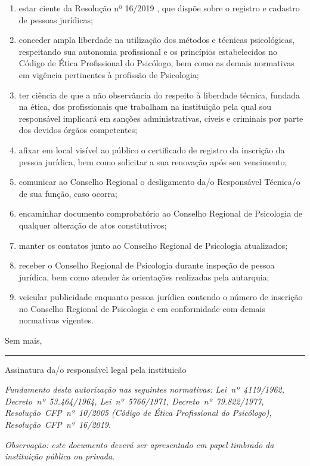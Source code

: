 \documentclass[openright, oneside, a4paper, article, 10pt, brazil]{abntex2}
\begin{document}
\begin{enumerate}
\item estar ciente da Resolução nº 16/2019 , que dispõe sobre o registro e cadastro de pessoas jurídicas;
\item conceder ampla liberdade na utilização dos métodos e técnicas psicológicas, respeitando sua autonomia profissional e os princípios estabelecidos no Código de Ética Profissional do Psicólogo, bem como as demais normativas em vigência pertinentes à profissão de Psicologia;
\item ter ciência de que a não observância do respeito à liberdade técnica, fundada na ética, dos profissionais que trabalham na instituição pela qual sou responsável implicará em sanções administrativas, cíveis e criminais por parte dos devidos órgãos competentes;
\item afixar em local visível ao público o certificado de registro da inscrição da pessoa jurídica, bem como solicitar a sua renovação após seu vencimento;
\item comunicar ao Conselho Regional o desligamento da/o Responsável Técnica/o de sua função, caso ocorra;
\item encaminhar documento comprobatório ao Conselho Regional de Psicologia de qualquer alteração de
atos constitutivos;
\item manter os contatos junto ao Conselho Regional de Psicologia atualizados;
\item receber o Conselho Regional de Psicologia durante inspeção de pessoa jurídica, bem como atender às orientações
realizadas pela autarquia;
\item veicular publicidade enquanto pessoa jurídica contendo o número de inscrição no Conselho Regional de Psicologia
e em conformidade com demais normativas vigentes.
\end{enumerate}
\vspace{\baselineskip}

\noindent Sem mais,
\vspace{1.5\baselineskip}

\vspace{5\baselineskip}

\rule{24em}{0.4pt}

\small Assinatura da/o responsável legal pela instituicão
\vfill

\raggedleft\scriptsize
\textit{Fundamento desta autorização nas seguintes normativas: Lei~nº~4119/1962, Decreto~nº~53.464/1964, Lei~nº~5766/1971,
Decreto~nº~79.822/1977, Resolução~CFP~nº~10/2005 (Código de Ética Profissional do Psicólogo), Resolução~CFP~nº~16/2019}.

\textit{Observação: este documento deverá ser apresentado em papel timbrado da instituição pública ou privada}.
\end{document}
